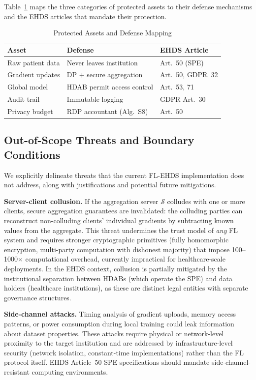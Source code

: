 \documentclass[conference,a4paper]{IEEEtran}
\begin{document}
Table~\ref{tab:protected_assets} maps the three categories of protected assets to their defense mechanisms and the EHDS articles that mandate their protection.

\begin{table}[htbp]
\centering
\caption{Protected Assets and Defense Mapping}
\label{tab:protected_assets}
\small
\begin{tabular}{p{2cm}p{2.8cm}p{2cm}}
\toprule
\textbf{Asset} & \textbf{Defense} & \textbf{EHDS Article} \\
\midrule
Raw patient data & Never leaves institution & Art.~50 (SPE) \\
Gradient updates & DP + secure aggregation & Art.~50, GDPR~32 \\
Global model & HDAB permit access control & Art.~53, 71 \\
Audit trail & Immutable logging & GDPR Art.~30 \\
Privacy budget & RDP accountant (Alg.~S8) & Art.~50 \\
\bottomrule
\end{tabular}
\end{table}

\subsection{Out-of-Scope Threats and Boundary Conditions}

We explicitly delineate threats that the current FL-EHDS implementation does not address, along with justifications and potential future mitigations.

\textbf{Server-client collusion.} If the aggregation server $\mathcal{S}$ colludes with one or more clients, secure aggregation guarantees are invalidated: the colluding parties can reconstruct non-colluding clients' individual gradients by subtracting known values from the aggregate. This threat undermines the trust model of \textit{any} FL system and requires stronger cryptographic primitives (fully homomorphic encryption, multi-party computation with dishonest majority) that impose 100--1000$\times$ computational overhead, currently impractical for healthcare-scale deployments. In the EHDS context, collusion is partially mitigated by the institutional separation between HDABs (which operate the SPE) and data holders (healthcare institutions), as these are distinct legal entities with separate governance structures.

\textbf{Side-channel attacks.} Timing analysis of gradient uploads, memory access patterns, or power consumption during local training could leak information about dataset properties. These attacks require physical or network-level proximity to the target institution and are addressed by infrastructure-level security (network isolation, constant-time implementations) rather than the FL protocol itself. EHDS Article~50 SPE specifications should mandate side-channel-resistant computing environments.
\end{document}

